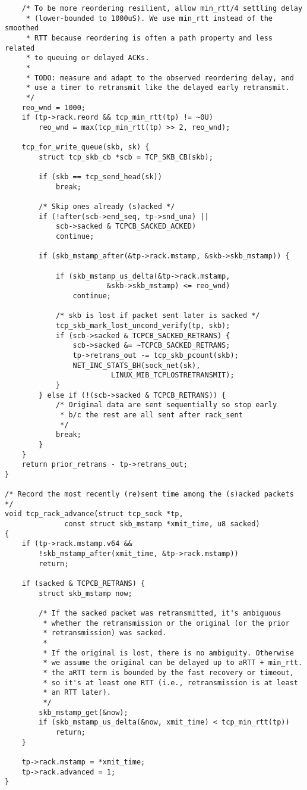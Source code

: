 \begin{verbatim}
    /* To be more reordering resilient, allow min_rtt/4 settling delay
     * (lower-bounded to 1000uS). We use min_rtt instead of the smoothed
     * RTT because reordering is often a path property and less related
     * to queuing or delayed ACKs.
     *
     * TODO: measure and adapt to the observed reordering delay, and
     * use a timer to retransmit like the delayed early retransmit.
     */
    reo_wnd = 1000;
    if (tp->rack.reord && tcp_min_rtt(tp) != ~0U)
        reo_wnd = max(tcp_min_rtt(tp) >> 2, reo_wnd);

    tcp_for_write_queue(skb, sk) {
        struct tcp_skb_cb *scb = TCP_SKB_CB(skb);

        if (skb == tcp_send_head(sk))
            break;

        /* Skip ones already (s)acked */
        if (!after(scb->end_seq, tp->snd_una) ||
            scb->sacked & TCPCB_SACKED_ACKED)
            continue;

        if (skb_mstamp_after(&tp->rack.mstamp, &skb->skb_mstamp)) {

            if (skb_mstamp_us_delta(&tp->rack.mstamp,
                        &skb->skb_mstamp) <= reo_wnd)
                continue;

            /* skb is lost if packet sent later is sacked */
            tcp_skb_mark_lost_uncond_verify(tp, skb);
            if (scb->sacked & TCPCB_SACKED_RETRANS) {
                scb->sacked &= ~TCPCB_SACKED_RETRANS;
                tp->retrans_out -= tcp_skb_pcount(skb);
                NET_INC_STATS_BH(sock_net(sk),
                         LINUX_MIB_TCPLOSTRETRANSMIT);
            }
        } else if (!(scb->sacked & TCPCB_RETRANS)) {
            /* Original data are sent sequentially so stop early
             * b/c the rest are all sent after rack_sent
             */
            break;
        }
    }
    return prior_retrans - tp->retrans_out;
}

/* Record the most recently (re)sent time among the (s)acked packets */
void tcp_rack_advance(struct tcp_sock *tp,
              const struct skb_mstamp *xmit_time, u8 sacked)
{
    if (tp->rack.mstamp.v64 &&
        !skb_mstamp_after(xmit_time, &tp->rack.mstamp))
        return;

    if (sacked & TCPCB_RETRANS) {
        struct skb_mstamp now;

        /* If the sacked packet was retransmitted, it's ambiguous
         * whether the retransmission or the original (or the prior
         * retransmission) was sacked.
         *
         * If the original is lost, there is no ambiguity. Otherwise
         * we assume the original can be delayed up to aRTT + min_rtt.
         * the aRTT term is bounded by the fast recovery or timeout,
         * so it's at least one RTT (i.e., retransmission is at least
         * an RTT later).
         */
        skb_mstamp_get(&now);
        if (skb_mstamp_us_delta(&now, xmit_time) < tcp_min_rtt(tp))
            return;
    }

    tp->rack.mstamp = *xmit_time;
    tp->rack.advanced = 1;
}
\end{verbatim}

